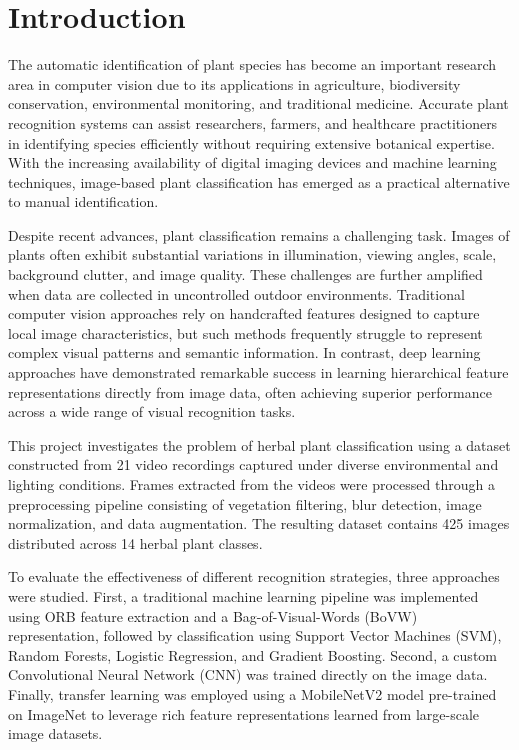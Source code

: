\section{Introduction}

The automatic identification of plant species has become an important research area in computer vision due to its applications in agriculture, biodiversity conservation, environmental monitoring, and traditional medicine. Accurate plant recognition systems can assist researchers, farmers, and healthcare practitioners in identifying species efficiently without requiring extensive botanical expertise. With the increasing availability of digital imaging devices and machine learning techniques, image-based plant classification has emerged as a practical alternative to manual identification.

Despite recent advances, plant classification remains a challenging task. Images of plants often exhibit substantial variations in illumination, viewing angles, scale, background clutter, and image quality. These challenges are further amplified when data are collected in uncontrolled outdoor environments. Traditional computer vision approaches rely on handcrafted features designed to capture local image characteristics, but such methods frequently struggle to represent complex visual patterns and semantic information. In contrast, deep learning approaches have demonstrated remarkable success in learning hierarchical feature representations directly from image data, often achieving superior performance across a wide range of visual recognition tasks.

This project investigates the problem of herbal plant classification using a dataset constructed from 21 video recordings captured under diverse environmental and lighting conditions. Frames extracted from the videos were processed through a preprocessing pipeline consisting of vegetation filtering, blur detection, image normalization, and data augmentation. The resulting dataset \cite{henrysml_herbal_plants} contains 425 images distributed across 14 herbal plant classes.

To evaluate the effectiveness of different recognition strategies, three approaches were studied. First, a traditional machine learning pipeline was implemented using ORB feature extraction and a Bag-of-Visual-Words (BoVW) representation, followed by classification using Support Vector Machines (SVM), Random Forests, Logistic Regression, and Gradient Boosting. Second, a custom Convolutional Neural Network (CNN) was trained directly on the image data. Finally, transfer learning was employed using a MobileNetV2 model pre-trained on ImageNet to leverage rich feature representations learned from large-scale image datasets.

